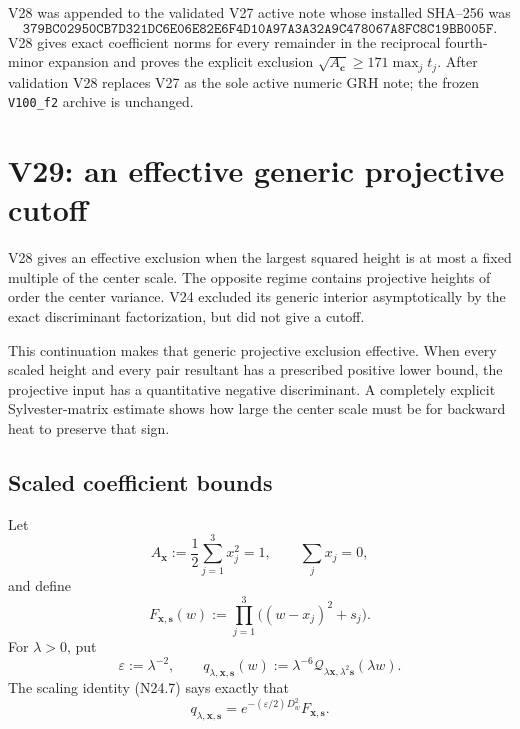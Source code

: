 \documentclass[11pt]{article}
\theoremstyle{definition}
\theoremstyle{remark}
\begin{document}
V28 was appended to the validated V27 active note whose installed
SHA--256 was
\[
 \texttt{379BC02950CB7D321DC6E06E82E6F4D10A97A3A32A9C478067A8FC8C19BB005F}.
 \tag{N28.25}
\]
V28 gives exact coefficient norms for every remainder in the reciprocal
fourth-minor expansion and proves the explicit exclusion
\(\sqrt{A_{\bm c}}\geq171\max_jt_j\).  After validation V28 replaces V27
as the sole active numeric GRH note; the frozen \texttt{V100\_f2} archive
is unchanged.



\section{V29: an effective generic projective cutoff}
\label{sec:f2v29-projective-cutoff}

V28 gives an effective exclusion when the largest squared height is at
most a fixed multiple of the center scale.  The opposite regime contains
projective heights of order the center variance.  V24 excluded its generic
interior asymptotically by the exact discriminant factorization, but did
not give a cutoff.

This continuation makes that generic projective exclusion effective.
When every scaled height and every pair resultant has a prescribed
positive lower bound, the projective input has a quantitative negative
discriminant.  A completely explicit Sylvester-matrix estimate shows how
large the center scale must be for backward heat to preserve that sign.

\subsection{Scaled coefficient bounds}
\label{subsec:f2v29-coefficients}

Let
\[
 A_{\bm x}:=\frac12\sum_{j=1}^3x_j^2=1,\qquad
 \sum_jx_j=0,
 \tag{N29.1}
\]
and define
\[
 F_{\bm x,\bm s}(w)
 :=\prod_{j=1}^3\bigl((w-x_j)^2+s_j\bigr).
 \tag{N29.2}
\]
For \(\lambda>0\), put
\[
 \varepsilon:=\lambda^{-2},\qquad
 q_{\lambda,\bm x,\bm s}(w)
 :=\lambda^{-6}
 \mathcal Q_{\lambda\bm x,\lambda^2\bm s}(\lambda w).
 \tag{N29.3}
\]
The scaling identity \textup{(N24.7)} says exactly that
\[
 q_{\lambda,\bm x,\bm s}
 =e^{-(\varepsilon/2)D_w^2}F_{\bm x,\bm s}.
 \tag{N29.4}
\]
\end{document}
